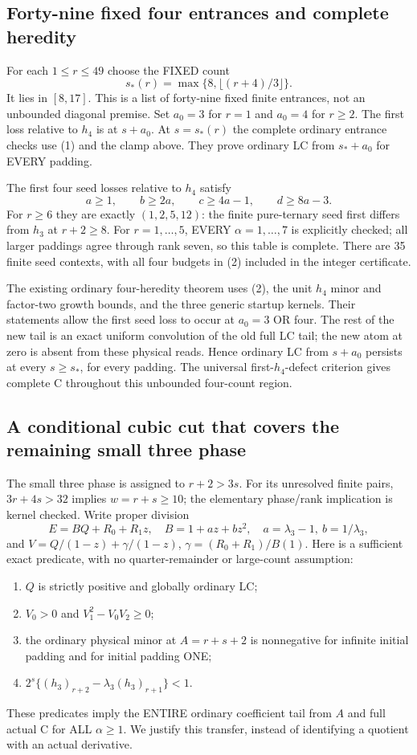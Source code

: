 \subsection{Forty-nine fixed four entrances and complete heredity}
For each $1\le r\le49$ choose the FIXED count
\[
                         s_*(r)=\max\{8,\lfloor(r+4)/3\rfloor\}.
\]
It lies in $[8,17]$. This is a list of forty-nine fixed finite entrances,
not an unbounded diagonal premise. Set $a_0=3$ for $r=1$ and $a_0=4$
for $r\ge2$. The first loss relative to $h_4$ is at $s+a_0$.
At $s=s_*(r)$ the complete ordinary entrance checks use (1) and the
clamp above. They prove ordinary LC from $s_*+a_0$ for EVERY padding.

The first four seed losses relative to $h_4$ satisfy
\[
 a\ge1,\qquad b\ge2a,\qquad c\ge4a-1,\qquad d\ge8a-3.       \tag{2}
\]
For $r\ge6$ they are exactly $(1,2,5,12)$: the finite pure-ternary
seed first differs from $h_3$ at $r+2\ge8$.
For $r=1,\ldots,5$, EVERY $\alpha=1,\ldots,7$ is explicitly checked;
all larger paddings agree through rank seven, so this table is complete.
There are 35 finite seed contexts, with all four budgets in (2)
included in the integer certificate.

The existing ordinary four-heredity theorem uses (2), the unit
$h_4$ minor and factor-two growth bounds, and the three generic
startup kernels. Their statements allow the first seed loss to occur
at $a_0=3$ OR four. The rest of the new tail is an exact uniform
convolution of the old full LC tail; the new atom at zero is absent
from these physical reads. Hence ordinary LC from $s+a_0$ persists
at every $s\ge s_*$, for every padding. The universal first-$h_4$-defect
criterion gives complete C throughout this unbounded four-count region.

\subsection{A conditional cubic cut that covers the remaining small three phase}
The small three phase is assigned to $r+2>3s$.
For its unresolved finite pairs, $3r+4s>32$ implies $w=r+s\ge10$;
the elementary phase/rank implication is kernel checked.
Write proper division
\[
 E=BQ+R_0+R_1z,\quad B=1+az+bz^2,\quad
 a=\lambda_3-1,\ b=1/\lambda_3,
\]
and $V=Q/(1-z)+\gamma/(1-z)$, $\gamma=(R_0+R_1)/B(1)$.
Here is a sufficient exact predicate, with no quarter-remainder or
large-count assumption:
\begin{enumerate}
\item $Q$ is strictly positive and globally ordinary LC;
\item $V_0>0$ and $V_1^2-V_0V_2\ge0$;
\item the ordinary physical minor at $A=r+s+2$ is nonnegative for
infinite initial padding and for initial padding ONE;
\item $2^s\{(h_3)_{r+2}-\lambda_3(h_3)_{r+1}\}<1$.
\end{enumerate}
These predicates imply the ENTIRE ordinary coefficient tail from $A$
and full actual C for ALL $\alpha\ge1$. We justify this transfer,
instead of identifying a quotient with an actual derivative.

